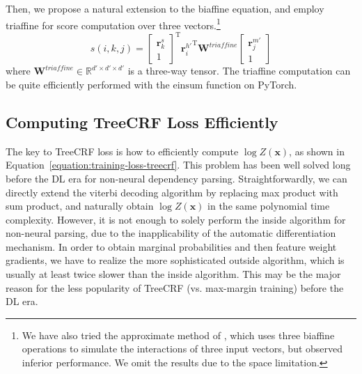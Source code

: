 \documentclass[11pt,a4paper]{article}
\begin{document}
Then, we
propose a natural extension to the biaffine equation, and employ triaffine for score computation over three vectors.\footnote{
  We have also tried the approximate method of \citet{wang-etal-2019-second}, which uses three
  biaffine operations to simulate the interactions of three input vectors, but observed inferior performance.
  We omit the results due to the space limitation.
}
\begin{equation} \label{equation:triaffine}
s(i,k,j) =
\left[
\begin{array}{c}
\mathbf{r}_{k}^{s} \\
1
\end{array}
\right]^\mathrm{T}
{\mathbf{r}_{i}^{h'}}^\mathrm{T}
\mathbf{W}^\textit{triaffine}
\left[
\begin{array}{c}
\mathbf{r}_{j}^{m'} \\
1
\end{array}
\right]
\end{equation}
where $\mathbf{W}^\textit{triaffine} \in \mathbb{R}^{d' \times d' \times d'}$ is a three-way tensor.
The triaffine computation can be quite efficiently performed with the $\mathrm{einsum}$ function on PyTorch.












\subsection{Computing TreeCRF Loss Efficiently}



The key to TreeCRF loss is how to efficiently compute $\log Z(\boldsymbol{x})$,
as shown in Equation~\ref{equation:training-loss-treecrf}.
This problem has been well solved long before the DL era
for non-neural dependency parsing.
Straightforwardly, we can directly extend the viterbi decoding algorithm by replacing max product with sum product, and naturally obtain $\log Z(\boldsymbol{x})$ in the same polynomial time complexity.
However, it is not enough to solely perform the inside algorithm for non-neural parsing, due to the inapplicability of the automatic differentiation mechanism. In order to obtain marginal probabilities and then feature weight gradients, we have to realize the more sophisticated outside algorithm, which is usually at least twice slower than the inside algorithm.
This may be the major reason for the less popularity of TreeCRF (vs. max-margin training) before the DL era.
\end{document}
